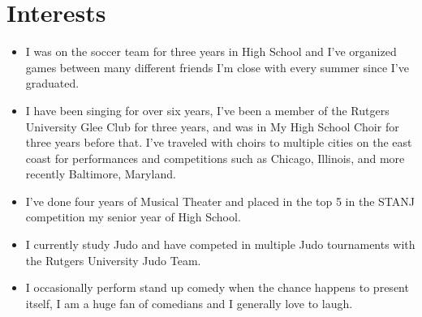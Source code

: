 \documentclass[12pt,a4paper,sans]{moderncv}        %
\begin{document}

\vspace{6pt}

\section{Interests}

\vspace{6pt}

\begin{itemize}

\item{I was on the soccer team for three years in High School and I've organized games between many different friends I'm close with every summer since I've graduated.}

\vspace{6pt}

\item{I have been singing for over six years, I've been a member of the Rutgers University Glee Club for three years, and was in My High School Choir for three years before that. I've traveled with choirs to multiple cities on the east coast for performances and competitions such as Chicago, Illinois, and more recently Baltimore, Maryland.} 

\vspace{6pt}

\item{I've done four years of Musical Theater and placed in the top 5 in the STANJ competition my senior year of High School.}

\vspace{6pt}

\item{I currently study Judo and have competed in multiple Judo tournaments with the Rutgers University Judo Team.}

\vspace{6pt}

\item{I occasionally perform stand up comedy when the chance happens to present itself, I am a huge fan of comedians and I generally love to laugh.}

\vspace{6pt}

\end{itemize}
\end{document}
